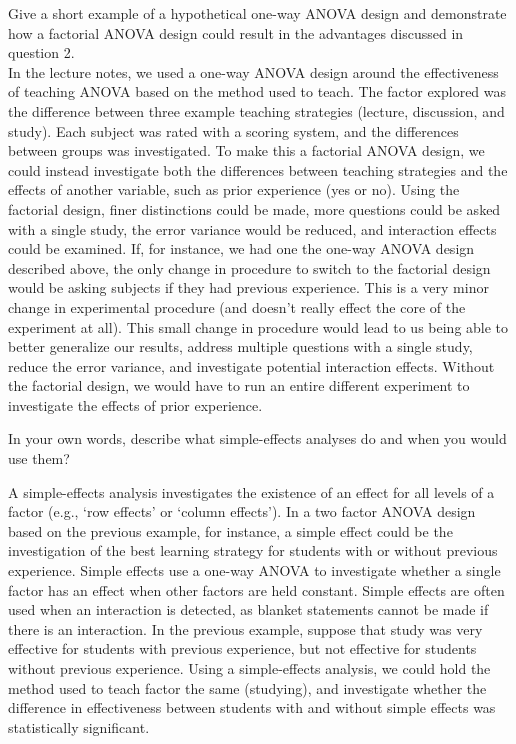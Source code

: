\documentclass[onecolumn,10pt]{jhwhw}
\begin{document}
\problem{}
Give a short example of a hypothetical one-way ANOVA design and demonstrate how a factorial ANOVA design could result in the advantages discussed in question 2.\\

In the lecture notes, we used a one-way ANOVA design around the effectiveness of teaching ANOVA based on the method used to teach. The factor explored was the difference between three example teaching strategies (lecture, discussion, and study). Each subject was rated with a scoring system, and the differences between groups was investigated. To make this a factorial ANOVA design, we could instead investigate both the differences between teaching strategies and the effects of another variable, such as prior experience (yes or no). Using the factorial design, finer distinctions could be made, more questions could be asked with a single study, the error variance would be reduced, and interaction effects could be examined. If, for instance, we had one the one-way ANOVA design described above, the only change in procedure to switch to the factorial design would be asking subjects if they had previous experience. This is a very minor change in experimental procedure (and doesn't really effect the core of the experiment at all). This small change in procedure would lead to us being able to better generalize our results, address multiple questions with a single study, reduce the error variance, and investigate potential interaction effects. Without the factorial design, we would have to run an entire different experiment to investigate the effects of prior experience.

\problem{}
In your own words, describe what simple-effects analyses do and when you would use them?

A simple-effects analysis investigates the existence of an effect for all levels of a factor (e.g., `row effects' or `column effects'). In a two factor ANOVA design based on the previous example, for instance, a simple effect could be the investigation of the best learning strategy for students with or without previous experience. Simple effects use a one-way ANOVA to investigate whether a single factor has an effect when other factors are held constant. Simple effects are often used when an interaction is detected, as blanket statements cannot be made if there is an interaction. In the previous example, suppose that study was very effective for students with previous experience, but not effective for students without previous experience. Using a simple-effects analysis, we could hold the method used to teach factor the same (studying), and investigate whether the difference in effectiveness between students with and without simple effects was statistically significant.
\end{document}
